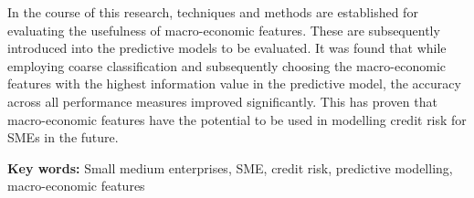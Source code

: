 \documentclass[11pt, oneside]{Thesis} %
\begin{document}
	In the course of this research, techniques and methods are established for evaluating the usefulness of macro-economic features. These are subsequently introduced into the predictive models to be evaluated. It was found that while employing coarse classification and subsequently choosing the macro-economic features with the highest information value in the predictive model, the accuracy across all performance measures improved significantly. This has proven that macro-economic features have the potential to be used in modelling credit risk for SMEs in the future.
	
	\textbf{Key words:} Small medium enterprises, SME, credit risk, predictive modelling, macro-economic features
		
		\clearpage
		
		
		\clearpage %
		
		
		\pagestyle{fancy} %
		
		\tableofcontents %
		
		\listoffigures %
		
		\listoftables %
		
		
\end{document}
